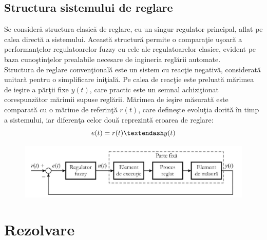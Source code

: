 \documentclass[11pt]{article}
\newcommand{\EqRow}{\vspace{1.5mm}}
\begin{document}
\subsection{Structura sistemului de reglare}
Se consideră structura clasică de reglare, cu un singur regulator principal, aflat pe calea directă a sistemului. Această structură permite o comparaţie uşoară a performanţelor regulatoarelor fuzzy cu cele ale regulatoarelor clasice, evident pe baza cunoştinţelor prealabile necesare de ingineria reglării automate.\\
Structura de reglare convenţională este un sistem cu reacţie negativă, considerată unitară pentru o simplificare iniţială. Pe calea de reacţie este preluată mărimea de ieşire a părţii fixe $y(t)$, care practic este un semnal achiziţionat corespunzător mărimii supuse reglării. Mărimea de ieşire măsurată este comparată cu o mărime de referinţă $r(t)$, care defineşte evoluţia dorită în timp a sistemului, iar diferenţa celor două reprezintă eroarea de reglare:\\
\begin{equation} 
e(t) = r(t) – y(t)
\EqRow
\end{equation}
\begin{figure}[H]
	\centering
	\includegraphics[width=0.8\linewidth]{struct_reg.png}
	\label{fig:test2}
\end{figure}

\newpage
\section{Rezolvare}

\newpage
\end{document}
